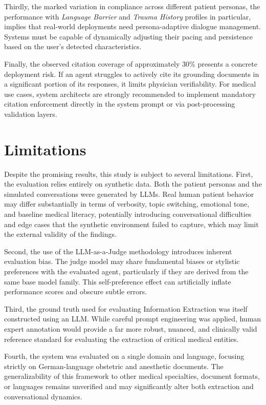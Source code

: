 Thirdly, the marked variation in compliance across different patient personas, the performance with \textit{Language Barrier} and \textit{Trauma History} profiles in particular, implies that real-world deployments need persona-adaptive dialogue management.
Systems must be capable of dynamically adjusting their pacing and persistence based on the user's detected characteristics.

Finally, the observed citation coverage of approximately 30\% presents a concrete deployment risk. 
If an agent struggles to actively cite its grounding documents in a significant portion of its responses, it limits physician verifiability. 
For medical use cases, system architects are strongly recommended to implement mandatory citation enforcement directly in the system prompt or via post-processing validation layers.

\section{Limitations}

Despite the promising results, this study is subject to several limitations. 
First, the evaluation relies entirely on synthetic data. 
Both the patient personas and the simulated conversations were generated by LLMs.
Real human patient behavior may differ substantially in terms of verbosity, topic switching, emotional tone, and baseline medical literacy, potentially introducing conversational difficulties and edge cases that the synthetic environment failed to capture, which may limit the external validity of the findings.

Second, the use of the LLM-as-a-Judge methodology introduces inherent evaluation bias. 
The judge model may share fundamental biases or stylistic preferences with the evaluated agent, particularly if they are derived from the same base model family. 
This self-preference effect can artificially inflate performance scores and obscure subtle errors.

Third, the ground truth used for evaluating Information Extraction was itself constructed using an LLM.
While careful prompt engineering was applied, human expert annotation would provide a far more robust, nuanced, and clinically valid reference standard for evaluating the extraction of critical medical entities.

Fourth, the system was evaluated on a single domain and language, focusing strictly on German-language obstetric and anesthetic documents. 
The generalizability of this framework to other medical specialties, document formats, or languages remains unverified and may significantly alter both extraction and conversational dynamics.

